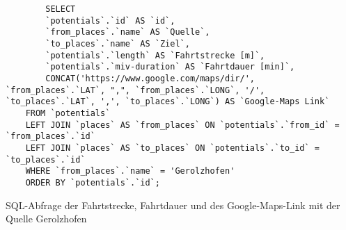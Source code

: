 \begin{listing}[htbp]
    \begin{verbatim}
        SELECT 
        `potentials`.`id` AS `id`, 
        `from_places`.`name` AS `Quelle`,
        `to_places`.`name` AS `Ziel`, 
        `potentials`.`length` AS `Fahrtstrecke [m]`, 
        `potentials`.`miv-duration` AS `Fahrtdauer [min]`,
        CONCAT('https://www.google.com/maps/dir/', `from_places`.`LAT`, ",", `from_places`.`LONG`, '/', `to_places`.`LAT`, ',', `to_places`.`LONG`) AS `Google-Maps Link`
    FROM `potentials`
    LEFT JOIN `places` AS `from_places` ON `potentials`.`from_id` = `from_places`.`id`
    LEFT JOIN `places` AS `to_places` ON `potentials`.`to_id` = `to_places`.`id`
    WHERE `from_places`.`name` = 'Gerolzhofen'
    ORDER BY `potentials`.`id`;
    \end{verbatim}
    \caption{SQL-Abfrage der Fahrtstrecke, Fahrtdauer und des Google-Maps-Link mit der Quelle Gerolzhofen}\label{lst-f-gerolzhofen}
\end{listing}
